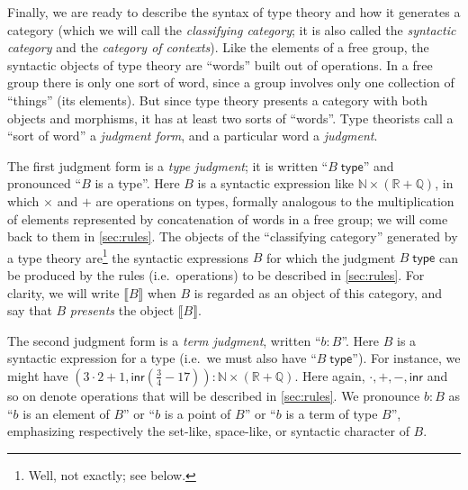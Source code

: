 \documentclass[10pt]{article}
\def\oo{\ensuremath{\infty}}
\def\ty{\;\mathsf{type}}
\def\m#1{\llbracket#1\rrbracket}
\def\N{\mathbb{N}}
\def\Q{\mathbb{Q}}
\def\R{\mathbb{R}}
\numberwithin{equation}{section}
\begin{document}
Finally, we are ready to describe the syntax of type theory and how it generates a category (which we will call the \emph{classifying category}; it is also called the \emph{syntactic category} and the \emph{category of contexts}).
Like the elements of a free group, the syntactic objects of type theory are ``words'' built out of operations.
In a free group there is only one sort of word, since a group involves only one collection of ``things'' (its elements).
But since type theory presents a category with both objects and morphisms, %
it has at least two sorts of ``words''.
Type theorists call a ``sort of word'' a \emph{judgment form}, and a particular word a \emph{judgment}.

The first judgment form is a \emph{type judgment}; it is written ``$B\ty$'' and pronounced ``$B$ is a type''.
Here $B$ is a syntactic expression like $\N\times (\R+\Q)$, %
in which $\times$ and $+$ are operations on types, formally analogous to the multiplication of elements represented by concatenation of words in a free group; we will come back to them in \cref{sec:rules}.
The objects of the ``classifying category'' generated by a type theory are\footnote{Well, not exactly; see below.} the syntactic expressions $B$ for which the judgment $B\ty$ can be produced by the rules (i.e.\ operations) to be described in \cref{sec:rules}.
For clarity, we will write $\m B$ when $B$ is regarded as an object of this category, and say that $B$ \emph{presents} the object $\m B$.

The second judgment form is a \emph{term judgment}, written ``$b:B$''.
Here $B$ is a syntactic expression for a type (i.e.\ we must also have ``$B\ty$'').
For instance, we might have $(3\cdot 2+1, \mathsf{inr}(\frac{3}{4}-17)) : \N\times (\R+\Q)$.%
Here again, $\cdot,+,-,\mathsf{inr}$ and so on denote operations that will be described in \cref{sec:rules}.
We pronounce $b:B$ as ``$b$ is an element of $B$'' or ``$b$ is a point of $B$'' or ``$b$ is a term of type $B$'', emphasizing respectively the set-like, space-like, or syntactic character of $B$.
\end{document}
